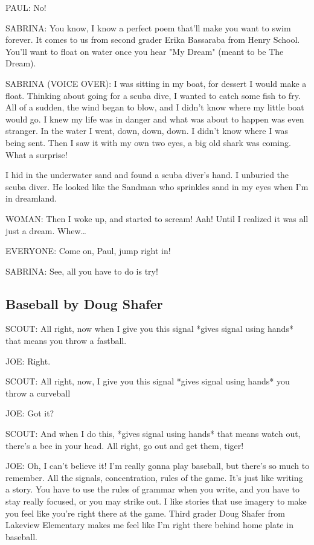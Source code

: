 PAUL:
No!

SABRINA:
You know, I know a perfect poem that'll make you want to swim forever.
It comes to us from second grader Erika Bassaraba from Henry School.
You'll want to float on water once you hear "My Dream" (meant to be The Dream).

SABRINA (VOICE OVER):
I was sitting in my boat, for dessert I would make a float.
Thinking about going for a scuba dive, I wanted to catch some fish to fry.
All of a sudden, the wind began to blow, and I didn't know where my little boat would go.
I knew my life was in danger and what was about to happen was even stranger.
In the water I went, down, down, down.
I didn't know where I was being sent.
Then I saw it with my own two eyes, a big old shark was coming.
What a surprise!

I hid in the underwater sand and found a scuba diver's hand.
I unburied the scuba diver.
He looked like the Sandman who sprinkles sand in my eyes when I'm in dreamland.

WOMAN:
Then I woke up, and started to scream!
Aah!
Until I realized it was all just a dream.
Whew\dots

EVERYONE:
Come on, Paul, jump right in!

SABRINA:
See, all you have to do is try!

\subsection{Baseball by Doug Shafer}

SCOUT:
All right, now when I give you this signal *gives signal using hands* that means you throw a fastball.

JOE:
Right.

SCOUT:
All right, now, I give you this signal *gives signal using hands* you throw a curveball

JOE:
Got it?

SCOUT:
And when I do this, *gives signal using hands* that means watch out, there's a bee in your head.
All right, go out and get them, tiger!

JOE:
Oh, I can't believe it!
I'm really gonna play baseball, but there's so much to remember.
All the signals, concentration, rules of the game.
It's just like writing a story.
You have to use the rules of grammar when you write, and you have to stay really focused, or you may strike out.
I like stories that use imagery to make you feel like you're right there at the game.
Third grader Doug Shafer from Lakeview Elementary makes me feel like I'm right there behind home plate in baseball.

